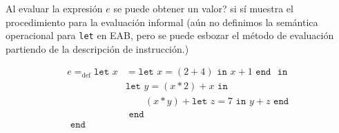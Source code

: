 



    \begin{exercise}
        Al evaluar la expresión $e$ se puede obtener un valor? si sí muestra el procedimiento para la evaluación informal (aún no definimos la semántica operacional para \texttt{let} en \textsf{EAB}, pero se puede esbozar el método de evaluación partiendo de la descripción de  instrucción.)
    
        \begin{align*}
        	e=_{\text{def}}\texttt{let  }
        		x&= \texttt{let }x = (2 + 4) \texttt{ in } x+1 \texttt{ end }
        		\texttt{ in }\\
        		 &\texttt{let }y=(x \ast 2)+x 
        		 	\texttt{ in } \\
        		 & \qquad(x\ast y) + \texttt{let }z=7 \texttt{ in } 
        		 						y+z 
        		 				\texttt{ end }\\
        		 &\texttt{ end }\\
        	\texttt{ end }&
        \end{align*}
    

\end{exercise}
